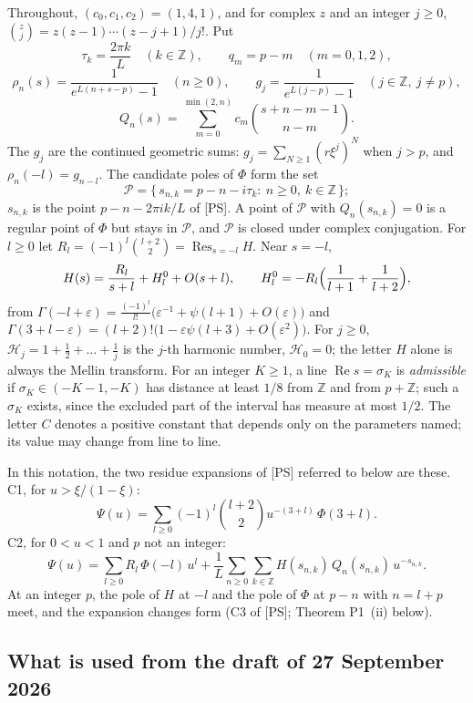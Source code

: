 \documentclass[11pt]{article}
\newcommand{\re}{\operatorname{Re}}
\newcommand{\Res}{\operatorname{Res}}
\newcommand{\Har}{\mathcal{H}}
\begin{document}
Throughout, $(c_0,c_1,c_2)=(1,4,1)$, and for complex $z$ and an integer $j\ge0$, $\binom{z}{j}=z(z-1)\cdots(z-j+1)/j!$. Put
\[
\tau_k=\frac{2\pi k}{L}\quad(k\in\mathbb{Z}),\qquad q_m=p-m\quad(m=0,1,2),
\]
\[
\rho_n(s)=\frac{1}{e^{L(n+s-p)}-1}\quad(n\ge0),\qquad g_j=\frac{1}{e^{L(j-p)}-1}\quad(j\in\mathbb{Z},\ j\ne p),
\]
\[
Q_n(s)=\sum_{m=0}^{\min(2,n)}c_m\binom{s+n-m-1}{n-m}.
\]
The $g_j$ are the continued geometric sums: $g_j=\sum_{N\ge1}(r\xi^j)^N$ when $j>p$, and $\rho_n(-l)=g_{n-l}$. The candidate poles of $\Phi$ form the set
\[
\mathcal{P}=\{\,s_{n,k}=p-n-i\tau_k:\ n\ge0,\ k\in\mathbb{Z}\,\};
\]
$s_{n,k}$ is the point $p-n-2\pi ik/L$ of [PS]. A point of $\mathcal{P}$ with $Q_n(s_{n,k})=0$ is a regular point of $\Phi$ but stays in $\mathcal{P}$, and $\mathcal{P}$ is closed under complex conjugation. For $l\ge0$ let $R_l=(-1)^l\binom{l+2}{2}=\Res_{s=-l}H$. Near $s=-l$,
\[
H(s)=\frac{R_l}{s+l}+H^0_l+O(s+l),\qquad H^0_l=-R_l\Bigl(\frac1{l+1}+\frac1{l+2}\Bigr),
\]
from $\Gamma(-l+\varepsilon)=\frac{(-1)^l}{l!}\bigl(\varepsilon^{-1}+\psi(l+1)+O(\varepsilon)\bigr)$ and $\Gamma(3+l-\varepsilon)=(l+2)!\bigl(1-\varepsilon\psi(l+3)+O(\varepsilon^2)\bigr)$. For $j\ge0$, $\Har_j=1+\frac12+\dots+\frac1j$ is the $j$-th harmonic number, $\Har_0=0$; the letter $H$ alone is always the Mellin transform. For an integer $K\ge1$, a line $\re s=\sigma_K$ is \emph{admissible} if $\sigma_K\in(-K-1,-K)$ has distance at least $1/8$ from $\mathbb{Z}$ and from $p+\mathbb{Z}$; such a $\sigma_K$ exists, since the excluded part of the interval has measure at most $1/2$. The letter $C$ denotes a positive constant that depends only on the parameters named; its value may change from line to line.

In this notation, the two residue expansions of [PS] referred to below are these. C1, for $u>\xi/(1-\xi)$:
\[
\Psi(u)=\sum_{l\ge0}(-1)^l\binom{l+2}{2}u^{-(3+l)}\,\Phi(3+l).
\]
C2, for $0<u<1$ and $p$ not an integer:
\[
\Psi(u)=\sum_{l\ge0}R_l\,\Phi(-l)\,u^l+\frac1L\sum_{n\ge0}\sum_{k\in\mathbb{Z}}H(s_{n,k})\,Q_n(s_{n,k})\,u^{-s_{n,k}}.
\]
At an integer $p$, the pole of $H$ at $-l$ and the pole of $\Phi$ at $p-n$ with $n=l+p$ meet, and the expansion changes form (C3 of [PS]; Theorem P1~(ii) below).

\subsection{What is used from the draft of 27 September 2026}\label{sec:draft}
\end{document}
